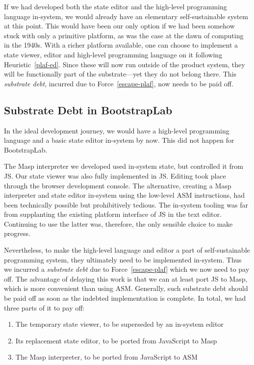 \documentclass[ twoside,openright,titlepage,numbers=noenddot,headinclude,footinclude,cleardoublepage=empty,abstract=on,
                BCOR=5mm,paper=a4,fontsize=11pt
                ]{scrreprt}
\providecommand{\tightlist}{}\newenvironment{longtable}[2]{\begin{tabular}}{\end{tabular}}
\theoremstyle{definition}
\begin{document}
If we had developed both the state editor and the high-level programming
language in-system, we would already have an elementary self-sustainable
system at this point. This would have been our only option if we had
been somehow stuck with only a primitive platform, as was the case at
the dawn of computing in the 1940s. With a richer platform available,
one can choose to implement a state viewer, editor and high-level
programming language on it following Heuristic~\ref{plaf-ed}. Since
these will now run outside of the product system, they will be
functionally part of the substrate---yet they do not belong there. This
\emph{substrate debt}, incurred due to Force~\ref{escape-plaf}, now
needs to be paid off.

\hypertarget{substrate-debt-in-bootstraplab}{\subsection{Substrate Debt in
BootstrapLab}\label{substrate-debt-in-bootstraplab}}

In the ideal development journey, we would have a high-level programming
language and a basic state editor in-system by now. This did not happen
for BootstrapLab.

The Masp interpreter we developed used in-system state, but controlled
it from \ac{JS}. Our state viewer was also fully implemented in \ac{JS}.
Editing took place through the browser development console. The
alternative, creating a Masp interpreter and state editor in-system
using the low-level ASM instructions, had been technically possible but
prohibitively tedious. The in-system tooling was far from supplanting
the existing platform interface of \ac{JS} in the text editor.
Continuing to use the latter was, therefore, the only sensible choice to
make progress.

Nevertheless, to make the high-level language and editor a part of
self-sustainable programming system, they ultimately need to be
implemented in-system. Thus we incurred a \emph{substrate debt} due to
Force~\ref{escape-plaf} which we now need to pay off. The advantage of
delaying this work is that we can at least port \ac{JS} to Masp, which
is more convenient than using ASM. Generally, such substrate debt should
be paid off as soon as the indebted implementation is complete. In
total, we had three parts of it to pay off:

\begin{enumerate}
\def\labelenumi{\arabic{enumi}.}
\tightlist
\item
  The temporary state viewer, to be superseded by an in-system editor
\item
  Its replacement state editor, to be ported from JavaScript to Masp
\item
  The Masp interpreter, to be ported from JavaScript to ASM
\end{enumerate}
\end{document}
